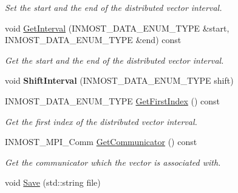 \begin{DoxyCompactItemize}
\begin{DoxyCompactList}\small\item\em Set the start and the end of the distributed vector interval. \end{DoxyCompactList}\item 
\hypertarget{classINMOST_1_1Solver_1_1Vector_ac0f756a71f19bf0138aea2b0d3716158}{void \hyperlink{classINMOST_1_1Solver_1_1Vector_ac0f756a71f19bf0138aea2b0d3716158}{Get\-Interval} (I\-N\-M\-O\-S\-T\-\_\-\-D\-A\-T\-A\-\_\-\-E\-N\-U\-M\-\_\-\-T\-Y\-P\-E \&start, I\-N\-M\-O\-S\-T\-\_\-\-D\-A\-T\-A\-\_\-\-E\-N\-U\-M\-\_\-\-T\-Y\-P\-E \&end) const }\label{classINMOST_1_1Solver_1_1Vector_ac0f756a71f19bf0138aea2b0d3716158}

\begin{DoxyCompactList}\small\item\em Get the start and the end of the distributed vector interval. \end{DoxyCompactList}\item 
\hypertarget{classINMOST_1_1Solver_1_1Vector_a2a299a3b6e1527aa796de228dd0d4d9c}{void {\bfseries Shift\-Interval} (I\-N\-M\-O\-S\-T\-\_\-\-D\-A\-T\-A\-\_\-\-E\-N\-U\-M\-\_\-\-T\-Y\-P\-E shift)}\label{classINMOST_1_1Solver_1_1Vector_a2a299a3b6e1527aa796de228dd0d4d9c}

\item 
\hypertarget{classINMOST_1_1Solver_1_1Vector_a1d4d48ac405bc05357acd35df7e92fb6}{I\-N\-M\-O\-S\-T\-\_\-\-D\-A\-T\-A\-\_\-\-E\-N\-U\-M\-\_\-\-T\-Y\-P\-E \hyperlink{classINMOST_1_1Solver_1_1Vector_a1d4d48ac405bc05357acd35df7e92fb6}{Get\-First\-Index} () const }\label{classINMOST_1_1Solver_1_1Vector_a1d4d48ac405bc05357acd35df7e92fb6}

\begin{DoxyCompactList}\small\item\em Get the first index of the distributed vector interval. \end{DoxyCompactList}\item 
\hypertarget{classINMOST_1_1Solver_1_1Vector_a73df3e02c177c8b410e781a8102e17cc}{I\-N\-M\-O\-S\-T\-\_\-\-M\-P\-I\-\_\-\-Comm \hyperlink{classINMOST_1_1Solver_1_1Vector_a73df3e02c177c8b410e781a8102e17cc}{Get\-Communicator} () const }\label{classINMOST_1_1Solver_1_1Vector_a73df3e02c177c8b410e781a8102e17cc}

\begin{DoxyCompactList}\small\item\em Get the communicator which the vector is associated with. \end{DoxyCompactList}\item 
\hypertarget{classINMOST_1_1Solver_1_1Vector_ac9b2f06b5abcb7025172c9cda28336fd}{void \hyperlink{classINMOST_1_1Solver_1_1Vector_ac9b2f06b5abcb7025172c9cda28336fd}{Save} (std\-::string file)}\label{classINMOST_1_1Solver_1_1Vector_ac9b2f06b5abcb7025172c9cda28336fd}


\end{DoxyCompactItemize}
